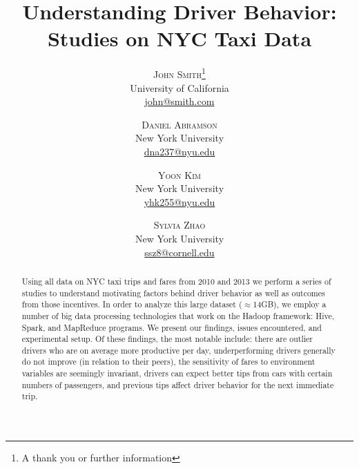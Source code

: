 \documentclass[twoside]{article}
\title{\vspace{-15mm}\fontsize{24pt}{10pt}\selectfont\textbf{Understanding Driver Behavior: Studies on NYC Taxi Data}} %
\author{
\large
\textsc{John Smith}\thanks{A thank you or further information}\\[2mm] %
\normalsize University of California \\ %
\normalsize \href{mailto:john@smith.com}{john@smith.com} %
\vspace{-5mm}
}
\author{
\large
\textsc{Daniel Abramson}\\[2mm] %
\normalsize New York University \\ %
\normalsize \href{mailto:dna237@nyu.edu}{dna237@nyu.edu} %
\vspace{-5mm}
\and
\textsc{Yoon Kim}\\[2mm] %
\normalsize New York University \\ %
\normalsize \href{mailto:yhk255@nyu.edu}{yhk255@nyu.edu} %
\vspace{-5mm}
\and
\textsc{Sylvia Zhao}\\[2mm] %
\normalsize New York University \\ %
\normalsize \href{mailto:ssz8@cornell.edu}{ssz8@cornell.edu} %
\vspace{-5mm}
}
\date{}
\begin{document}
\maketitle %

\thispagestyle{fancy} %


\begin{abstract}

\noindent Using all data on NYC taxi trips and fares from 2010 and 2013 we perform a series of studies to understand motivating factors behind driver behavior as well as outcomes from those incentives. In order to analyze this large dataset ($\approx$14GB), we employ a number of big data processing technologies that work on the Hadoop framework: Hive, Spark, and MapReduce programs.  We present our findings, issues encountered, and experimental setup. Of these findings, the most notable include: there are outlier drivers who are on average more productive per day, underperforming drivers generally do not improve (in relation to their peers), the sensitivity of fares to environment variables are seemingly invariant, drivers can expect better tips from cars with certain numbers of passengers, and previous tips affect driver behavior for the next immediate trip. 

\end{abstract}

\end{document}
